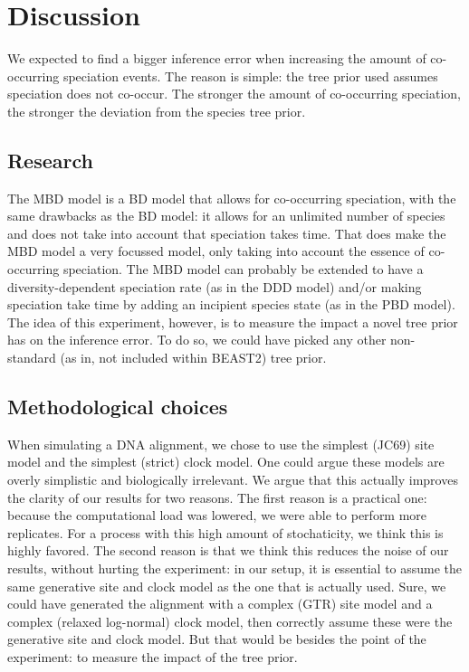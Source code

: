 \section{Discussion}

We  expected to find a bigger inference error 
when increasing the amount of co-occurring speciation events.
The reason is simple: the tree prior used assumes speciation does not
co-occur. The stronger the amount of co-occurring speciation, the stronger
the deviation from the species tree prior.

\subsection{Research}

The MBD model is a BD model that allows for co-occurring speciation,
with the same drawbacks as the BD model: it allows for an unlimited 
number of species and does not take into account that speciation takes time.
That does make the MBD model a very focussed model, only taking into 
account the essence of co-occurring speciation. The MBD model can probably
be extended to have a diversity-dependent speciation rate (as in the 
DDD model) and/or making speciation take time by adding 
an incipient species state (as in the PBD model).
The idea of this experiment, however, is to measure the impact a novel
tree prior has on the inference error. To do so, we could have picked
any other non-standard (as in, not included within BEAST2) tree prior.

\subsection{Methodological choices}

When simulating a DNA alignment, we chose to use the simplest (JC69) site
model and the simplest (strict) clock model. One could argue these models
are overly simplistic and biologically irrelevant. We argue that this
actually improves the clarity of our results for two reasons. The first
reason is a practical one: because the computational load was lowered,
we were able to perform more replicates. For a process with this high
amount of stochaticity, we think this is highly favored. The second reason
is that we think this reduces the noise of our results, without 
hurting the experiment: in our setup, it is essential
to assume the same generative site and clock model as the one that is actually 
used. Sure, we could have generated the alignment with a 
complex (GTR) site model and a complex (relaxed log-normal) clock model, then
correctly assume these were the generative site and clock model.
But that would be besides the point of the experiment: to measure the impact
of the tree prior.

